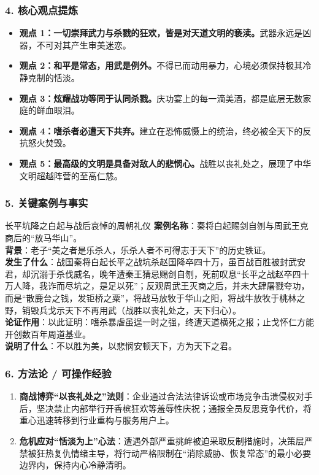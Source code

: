 \subsubsection{4. 核心观点提炼}
\begin{itemize}
    \item \textbf{观点 1：一切崇拜武力与杀戮的狂欢，皆是对天道文明的亵渎。}武器永远是凶器，不可对其产生审美迷恋。
    \item \textbf{观点 2：和平是常态，用武是例外。}不得已而动用暴力，心境必须保持极其冷静克制的恬淡。
    \item \textbf{观点 3：炫耀战功等同于认同杀戮。}庆功宴上的每一滴美酒，都是底层无数家庭的鲜血眼泪。
    \item \textbf{观点 4：嗜杀者必遭天下共弃。}建立在恐怖威慑上的统治，终必被全天下的反抗怒火焚毁。
    \item \textbf{观点 5：最高级的文明是具备对敌人的悲悯心。}战胜以丧礼处之，展现了中华文明超越阵营的至高仁慈。
\end{itemize}

\subsubsection{5. 关键案例与事实}
\begin{CaseBox}{长平坑降之白起与战后哀悼的周朝礼仪}
\textbf{案例名称}：秦将白起赐剑自刎与周武王克商后的“放马华山”。\\
\textbf{背景}：老子“美之者是乐杀人，乐杀人者不可得志于天下”的历史铁证。\\
\textbf{发生了什么}：战国秦将白起长平之战坑杀赵国降卒四十万，虽百战百胜被封武安君，却沉溺于杀伐威名，晚年遭秦王猜忌赐剑自刎，死前叹息“长平之战赵卒四十万人降，我诈而尽坑之，是足以死”；反观周武王灭商之后，并未大肆屠戮夸功，而是“散鹿台之钱，发钜桥之粟”，将战马放牧于华山之阳，将战牛放牧于桃林之野，销毁兵戈示天下不再用武（战胜以丧礼处之，天下归心）。\\
\textbf{论证作用}：以此证明：嗜杀暴虐虽逞一时之强，终遭天道横死之报；止戈怀仁方能开创数百年周道基业。\\
\textbf{说明了什么}：不以胜为美，以悲悯安顿天下，方为天下之君。
\end{CaseBox}

\subsubsection{6. 方法论 / 可操作经验}
\begin{enumerate}
    \item \textbf{商战博弈“以丧礼处之”法则}：企业通过合法法律诉讼或市场竞争击溃侵权对手后，坚决禁止内部举行开香槟狂欢等羞辱性庆祝；通报全员反思竞争代价，将重心迅速转移到行业重构与服务用户上。
    \item \textbf{危机应对“恬淡为上”心法}：遭遇外部严重挑衅被迫采取反制措施时，决策层严禁被狂热复仇情绪主导，将行动严格限制在“消除威胁、恢复常态”的最小必要边界内，保持内心冷静清明。
\end{enumerate}


